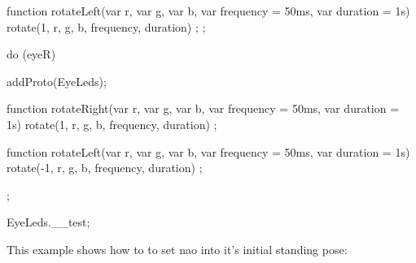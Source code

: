 \begin{urbiunchecked}
{  function rotateLeft(var r, var g, var b, var frequency = 50ms,
                      var duration = 1s) {
    rotate(1, r, g, b, frequency, duration)
  };
};

do (eyeR)
{
  addProto(EyeLeds);

  function rotateRight(var r, var g, var b, var frequency = 50ms,
                       var duration = 1s) {
    rotate(1, r, g, b, frequency, duration)
  };

  function rotateLeft(var r, var g, var b, var frequency = 50ms,
                      var duration = 1s) {
    rotate(-1, r, g, b, frequency, duration)
  };
};

EyeLeds.__test;
\end{urbiunchecked}

This example shows how to to set nao into it's initial standing pose:

